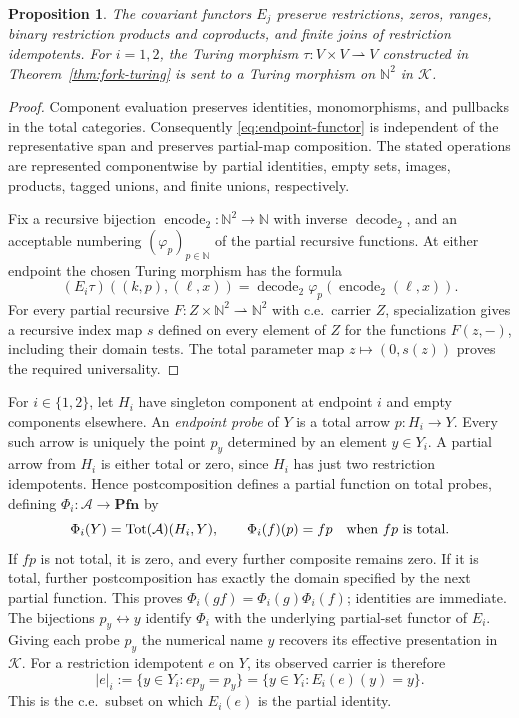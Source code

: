 \documentclass[11pt]{article}
\newtheorem{proposition}[theorem]{Proposition}
\newcommand{\N}{\mathbb N}
\newcommand{\Pfn}{\mathbf{Pfn}}
\begin{document}
\begin{proposition}\label{prop:endpoint}
The covariant functors $E_j$ preserve restrictions, zeros, ranges,
binary restriction products and coproducts, and finite joins of
restriction idempotents.
For $i=1,2$, the Turing morphism
$\tau:V\times V\rightharpoonup V$ constructed in
Theorem~\ref{thm:fork-turing} is sent
to a Turing morphism on $\N^2$ in $\mathcal K$.
\end{proposition}
\begin{proof}
Component evaluation preserves identities, monomorphisms, and
pullbacks in the total categories. Consequently \eqref{eq:endpoint-functor}
is independent of the representative span and preserves partial-map
composition. The stated operations are represented componentwise by
partial identities, empty sets, images, products, tagged unions, and
finite unions, respectively.

Fix a recursive bijection $\operatorname{encode}_2:\N^2\to\N$
with inverse $\operatorname{decode}_2$, and an acceptable numbering
$(\varphi_p)_{p\in\N}$ of the partial recursive functions.
At either endpoint the chosen
Turing morphism has the formula
\[
 (E_i\tau)((k,p),(\ell,x))
 =\operatorname{decode}_2\varphi_p(\operatorname{encode}_2(\ell,x)).
\]
For every partial recursive
$F:Z\times\N^2\rightharpoonup\N^2$ with c.e.\ carrier $Z$,
specialization gives a recursive index map $s$ defined on every
element of $Z$ for
the functions $F(z,-)$, including their domain tests.
The total parameter map $z\mapsto(0,s(z))$ proves the required
universality.
\end{proof}

For $i\in\{1,2\}$, let $H_i$ have singleton component at endpoint $i$ and empty
components elsewhere. An \emph{endpoint probe} of $Y$ is a total
arrow $p:H_i\to Y$. Every such arrow is uniquely
the point $p_y$ determined by an element $y\in Y_i$. A partial
arrow from $H_i$ is either total or zero, since $H_i$ has just
two restriction idempotents. Hence postcomposition defines a partial
function on total probes, defining $\Phi_i:\mathcal A\to\Pfn$ by
\[
 \Phi_i(Y)=\operatorname{Tot}(\mathcal A)(H_i,Y),\qquad
 \Phi_i(f)(p)=fp\quad\hbox{when }fp\hbox{ is total}.
\]
If $fp$ is not total, it is zero, and every further composite
remains zero. If it is total, further postcomposition has exactly
the domain specified by the next partial function. This proves
$\Phi_i(gf)=\Phi_i(g)\Phi_i(f)$; identities are immediate.
The bijections $p_y\leftrightarrow y$ identify $\Phi_i$ with the
underlying partial-set functor of $E_i$. Giving each probe $p_y$
the numerical name $y$ recovers its effective presentation in
$\mathcal K$.
For a restriction idempotent $e$ on $Y$, its observed carrier is therefore
\begin{equation}\label{eq:probe-domain}
 |e|_i:=\{y\in Y_i:ep_y=p_y\}
       =\{y\in Y_i:E_i(e)(y)=y\}.
\end{equation}
This is the c.e.\ subset on which $E_i(e)$ is the partial identity.
\end{document}

